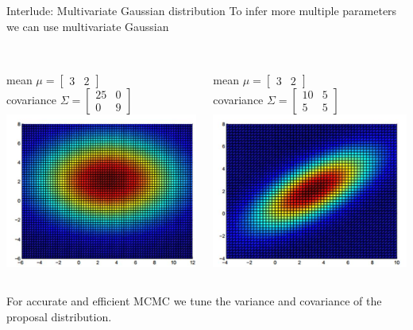 \documentclass[compress]{beamer}
\begin{document}
\begin{frame}[label=sec-8-2]{Interlude: Multivariate Gaussian distribution}
    To infer more multiple parameters we can use multivariate Gaussian\\~\\
    \begin{columns}[c] 
    mean $\mu = \begin{bmatrix} 3 & 2 \end{bmatrix}$\\
    covariance $\Sigma =  \begin{bmatrix} 25 & 0 \\ 0 & 9 \end{bmatrix}$
    \includegraphics[width=0.8\linewidth]{MVN1}

    mean $\mu = \begin{bmatrix} 3 & 2 \end{bmatrix}$\\
    covariance $\Sigma =  \begin{bmatrix} 10 & 5 \\ 5 & 5 \end{bmatrix}$
    \includegraphics[width=0.8\linewidth]{MVN2}
\end{columns}  
For accurate and efficient MCMC we tune the variance and covariance of the proposal distribution.
\end{frame}
\end{document}

